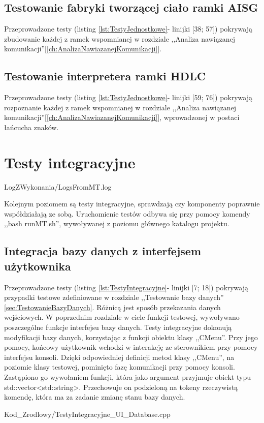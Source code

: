     \subsection{Testowanie fabryki tworzącej ciało ramki AISG}
        Przeprowadzone testy (listing \ref{lst:TestyJednostkowe}- linijki [38; 57]) pokrywają zbudowanie każdej z ramek
        wspomnianej w rozdziale ,,Analiza nawiązanej komunikacji''[\ref{ch:AnalizaNawiazanejKomunikacji}].
    \subsection{Testowanie interpretera ramki HDLC}
        Przeprowadzone testy (listing \ref{lst:TestyJednostkowe}- linijki [59; 76]) pokrywają rozpoznanie każdej z ramek 
        wspomnianej w rozdziale ,,Analiza nawiązanej komunikacji''[\ref{ch:AnalizaNawiazanejKomunikacji}], wprowadzonej w postaci łańcucha znaków.


\section{Testy integracyjne}
    
    {LogZWykonania/LogsFromMT.log}
    
    Kolejnym poziomem są testy integracyjne, sprawdzają czy komponenty poprawnie współdziałają ze sobą. \cite{Testowanie}
    Uruchomienie testów odbywa się przy pomocy komendy ,,bash runMT.sh'', wywoływanej z poziomu głównego katalogu projektu.
    
    \subsection{Integracja bazy danych z interfejsem użytkownika}
    Przeprowadzone testy (listing \ref{lst:TestyIntegracyjne}- linijki [7; 18]) pokrywają przypadki testowe zdefiniowane w rozdziale ,,Testowanie bazy danych''
    \ref{sec:TestowanieBazyDanych}.
    Różnicą jest sposób przekazania danych wejściowych. W poprzednim rozdziale w ciele funkcji testowej, wywoływano poszczególne funkcje interfejsu bazy danych.
    Testy integracyjne dokonują modyfikacji bazy danych, korzystając z funkcji obiektu klasy ,,CMenu''. Przy jego pomocy, końcowy użytkownik wchodzi w interakcję ze sterownikiem  
    przy pomocy interfejsu konsoli. Dzięki odpowiedniej definicji metod klasy ,,CMenu'', na poziomie klasy testowej, pominięto fazę komunikacji przy pomocy konsoli.
    Zastąpiono go wywołaniem funkcji, która jako argument przyjmuje obiekt typu std::vector<std::string>. Przechowuje on podzieloną na tokeny rzeczywistą komendę,
    która ma za zadanie zmianę stanu bazy danych.
    
        {Kod_Zrodlowy/TestyIntegracyjne_UI_Database.cpp}

